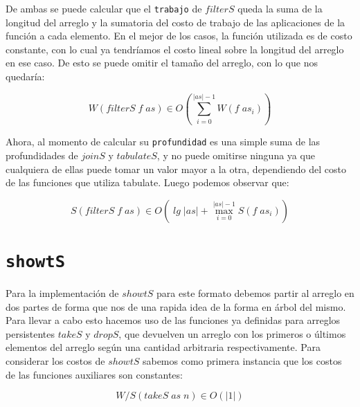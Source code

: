 \documentclass[a4paper,10pt]{article}
\begin{document}
\bigskip
\bigskip

    De ambas se puede calcular que el \texttt{trabajo} de $filterS$ queda la
suma de la longitud del arreglo y la sumatoria del costo de trabajo de las
aplicaciones de la función a cada elemento. En el mejor de los casos, la función
utilizada es de costo constante, con lo cual ya tendríamos el costo lineal sobre
la longitud del arreglo en ese caso. De esto se puede omitir el tamaño del arreglo,
con lo que nos quedaría:
 
\begin{equation*}
    W \left(filterS \;f \;as \right) \in
    O \left( \sum_{i=0}^{\vert as \vert -1} W \left( f\; as_i \right) \right)
\end{equation*}

\bigskip

    Ahora, al momento de calcular su \texttt{profundidad} es una simple suma
de las profundidades de $joinS$ y $tabulateS$, y no puede omitirse ninguna ya
que cualquiera de ellas puede tomar un valor mayor a la otra, dependiendo del
costo de las funciones que utiliza tabulate. Luego podemos observar que:

\begin{equation*}
    S \left( filterS \;f \;as \right) \in
    O \left( \;lg \; \vert as \vert + \max_{i=0}^{\vert as \vert -1} S \left( f\; as_i \right) \right)
\end{equation*}


\bigskip


\section*{\texttt{showtS}}

    Para la implementación de $showtS$ para este formato debemos partir al arreglo
en dos partes de forma que nos de una rapida idea de la forma en árbol del mismo.
Para llevar a cabo esto hacemos uso de las funciones ya definidas para arreglos 
persistentes $takeS$ y $dropS$, que devuelven un arreglo con los primeros o últimos
elementos del arreglo según una cantidad arbitraria respectivamente.
    Para considerar los costos de $showtS$ sabemos como primera instancia que los
costos de las funciones auxiliares son constantes:

\begin{equation*}
    W/S \left( takeS\; as\; n \right) \in 
    O \left( \vert 1 \vert \right)
\end{equation*}
\end{document}
